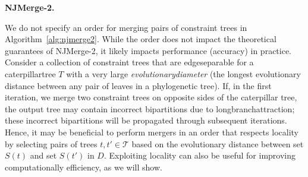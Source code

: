 \begin{algorithm}[!h]
\footnotesize
{}
\caption{{\bf NJMerge-2.}}
\label{alg:njmerge2}
\DontPrintSemicolon
\SetAlgoNoLine
\SetAlgoNoEnd
{}
\vspace{.1in}
\vspace{-4pt}

\hrulefill

 \vspace{3pt}
\end{algorithm}

We do not specify an order for merging pairs of constraint trees in Algorithm~\ref{alg:njmerge2}.
While the order does not impact the theoretical guarantees of NJMerge-2, it likely impacts performance (accuracy) in practice. 
Consider a collection of constraint trees that are \gls{edgeseparable} for a \gls{caterpillartree} $T$ with a very large \textit{\gls{evolutionarydiameter}} (the longest evolutionary distance between any pair of leaves in a phylogenetic tree).
If, in the first iteration, we merge two constraint trees on opposite sides of the caterpillar tree, the output tree may contain incorrect \glspl{bipartition} due to \gls{longbranchattraction}; these incorrect bipartitions will be propagated through subsequent iterations.
Hence, it may be beneficial to perform mergers in an order that respects locality by selecting pairs of trees $t, t' \in \mathcal{T}$ based on the evolutionary distance between set $S(t)$ and set $S(t')$ in $D$. 
Exploiting locality can also be useful for improving computationally efficiency, as we will show.

